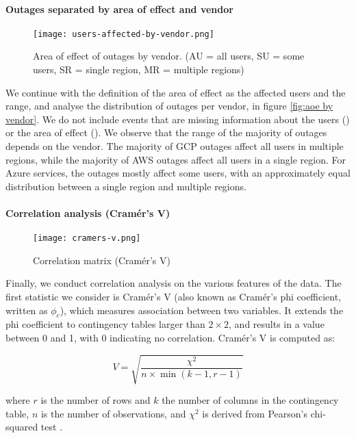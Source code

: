 \paragraph{Outages separated by area of effect and vendor}
\begin{figure}
  \centering
  \texttt{[image: users-affected-by-vendor.png]}
  \caption{Area of effect of outages by vendor. (AU = all users, SU = some users, SR = single region, MR = multiple regions)}
  \label{fig:aoe by vendor}
\end{figure}

We continue with the definition of the area of effect as the affected users and the range, and analyse the distribution of outages per vendor, in figure \autoref{fig:aoe by vendor}.
We do not include events that are missing information about the users () or the area of effect ().
We observe that the range of the majority of outages depends on the vendor.
The majority of GCP outages affect all users in multiple regions, while the majority of AWS outages affect all users in a single region.
For Azure services, the outages mostly affect some users, with an approximately equal distribution between a single region and multiple regions.

\paragraph{Correlation analysis (Cram\'{e}r's V)}
\begin{figure}
  \centering
  \texttt{[image: cramers-v.png]}
  \caption{Correlation matrix (Cram\'{e}r's V)}
  \label{fig:cramers v}
\end{figure}

Finally, we conduct correlation analysis on the various features of the data.
The first statistic we consider is Cram\'{e}r's V (also known as Cram\'{e}r's phi coefficient, written as $\phi_c$), which measures association between two variables.
It extends the phi coefficient to contingency tables larger than $2 \times 2$, and results in a value between 0 and 1, with 0 indicating no correlation.
Cram\'{e}r's V is computed as:

$$
V = \sqrt{\frac{\chi^2}{n \times \min{(k-1, r-1)}}}
$$

where $r$ is the number of rows and $k$ the number of columns in the contingency table, $n$ is the number of observations, and $\chi^2$ is derived from Pearson's chi-squared test \cite{holmes1998}.

